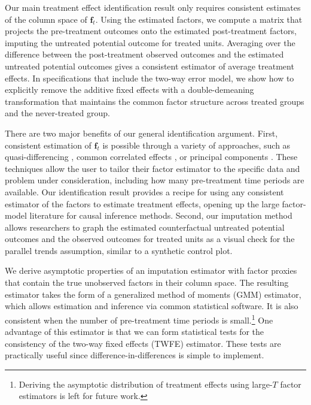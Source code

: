 \documentclass[12pt]{article}
\begin{document}
Our main treatment effect identification result only requires consistent estimates of the column space of $\bm f_t$. Using the estimated factors, we compute a matrix that projects the pre-treatment outcomes onto the estimated post-treatment factors, imputing the untreated potential outcome for treated units. Averaging over the difference between the post-treatment observed outcomes and the estimated untreated potential outcomes gives a consistent estimator of average treatment effects. In specifications that include the two-way error model, we show how to explicitly remove the additive fixed effects with a double-demeaning transformation that maintains the common factor structure across treated groups and the never-treated group.

There are two major benefits of our general identification argument. First, consistent estimation of $\bm f_t$ is possible through a variety of approaches, such as quasi-differencing \citep{Ahn_Lee_Schmidt_2013,Callaway_Karami_2020}, common correlated effects \citep{pesaran2006estimation,Westerlund_Petrova_Norkute_2019}, or principal components \citep{Bai_2009,Fan_2016,Westerlund_2020,Chan_and_Kwok_2022}. These techniques allow the user to tailor their factor estimator to the specific data and problem under consideration, including how many pre-treatment time periods are available. Our identification result provides a recipe for using any consistent estimator of the factors to estimate treatment effects, opening up the large factor-model literature for causal inference methods. Second, our imputation method allows researchers to graph the estimated counterfactual untreated potential outcomes and the observed outcomes for treated units as a visual check for the parallel trends assumption, similar to a synthetic control plot.

We derive asymptotic properties of an imputation estimator with factor proxies that contain the true unobserved factors in their column space. The resulting estimator takes the form of a generalized method of moments (GMM) estimator, which allows estimation and inference via common statistical software. It is also consistent when the number of pre-treatment time periods is small.\footnote{Deriving the asymptotic distribution of treatment effects using large-$T$ factor estimators is left for future work.} One advantage of this estimator is that we can form statistical tests for the consistency of the two-way fixed effects (TWFE) estimator. These tests are practically useful since difference-in-differences is simple to implement. 
\end{document}
